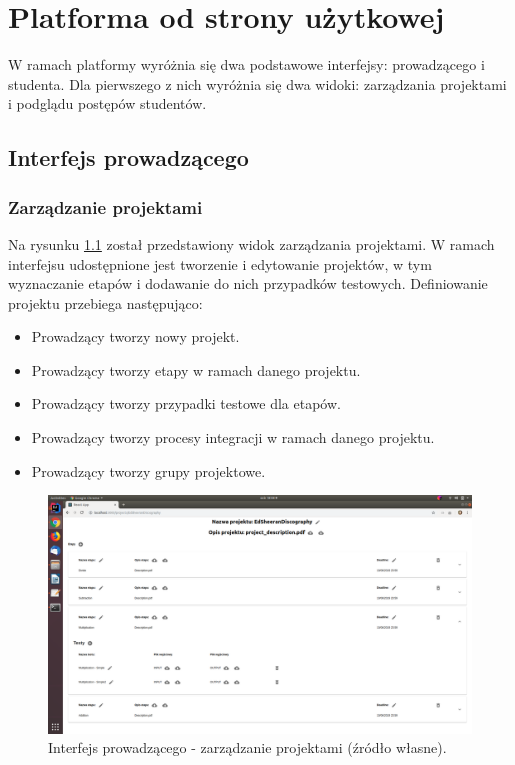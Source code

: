 \chapter{Platforma od strony użytkowej}
\label{chapter:interfaces}

W ramach platformy wyróżnia się dwa podstawowe interfejsy: prowadzącego i studenta.
Dla pierwszego z nich wyróżnia się dwa widoki: zarządzania projektami i podglądu postępów studentów.

\section{Interfejs prowadzącego}

\subsection{Zarządzanie projektami}

Na rysunku \ref{fig:lecturer-interface-management} został przedstawiony widok zarządzania projektami.
W ramach interfejsu udostępnione jest tworzenie i edytowanie projektów, w tym wyznaczanie etapów i dodawanie do nich przypadków testowych.
Definiowanie projektu przebiega następująco:
\begin {itemize}
    \item Prowadzący tworzy nowy projekt.
    \item Prowadzący tworzy etapy w ramach danego projektu.
    \item Prowadzący tworzy przypadki testowe dla etapów.
    \item Prowadzący tworzy procesy integracji w ramach danego projektu.
    \item Prowadzący tworzy grupy projektowe.
\end {itemize}

\begin{figure}[h]
    \centering
    \includegraphics[width = 13cm]{chapter04/lecturer_interface_management.png}
    \caption{Interfejs prowadzącego - zarządzanie projektami (źródło własne).}
    \label{fig:lecturer-interface-management}
\end{figure}

